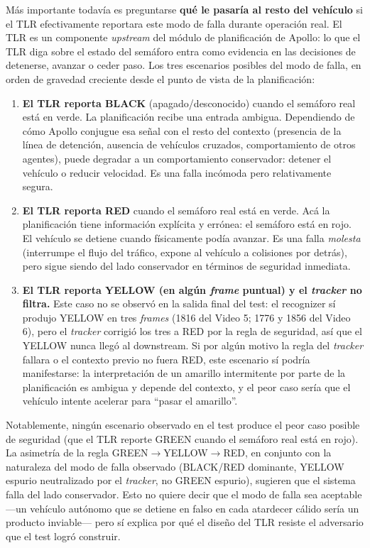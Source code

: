 Más importante todavía es preguntarse \textbf{qué le pasaría al resto del vehículo} si el TLR efectivamente reportara este modo de falla durante operación real. El TLR es un componente \textit{upstream} del módulo de planificación de Apollo: lo que el TLR diga sobre el estado del semáforo entra como evidencia en las decisiones de detenerse, avanzar o ceder paso. Los tres escenarios posibles del modo de falla, en orden de gravedad creciente desde el punto de vista de la planificación:

\begin{enumerate}
    \item \textbf{El TLR reporta BLACK} (apagado/desconocido) cuando el semáforo real está en verde. La planificación recibe una entrada ambigua. Dependiendo de cómo Apollo conjugue esa señal con el resto del contexto (presencia de la línea de detención, ausencia de vehículos cruzados, comportamiento de otros agentes), puede degradar a un comportamiento conservador: detener el vehículo o reducir velocidad. Es una falla incómoda pero relativamente segura.

    \item \textbf{El TLR reporta RED} cuando el semáforo real está en verde. Acá la planificación tiene información explícita y errónea: el semáforo está en rojo. El vehículo se detiene cuando físicamente podía avanzar. Es una falla \textit{molesta} (interrumpe el flujo del tráfico, expone al vehículo a colisiones por detrás), pero sigue siendo del lado conservador en términos de seguridad inmediata.

    \item \textbf{El TLR reporta YELLOW (en algún \textit{frame} puntual) y el \textit{tracker} no filtra.} Este caso no se observó en la salida final del test: el recognizer sí produjo YELLOW en tres \textit{frames} (1816 del Video 5; 1776 y 1856 del Video 6), pero el \textit{tracker} corrigió los tres a RED por la regla de seguridad, así que el YELLOW nunca llegó al downstream. Si por algún motivo la regla del \textit{tracker} fallara o el contexto previo no fuera RED, este escenario sí podría manifestarse: la interpretación de un amarillo intermitente por parte de la planificación es ambigua y depende del contexto, y el peor caso sería que el vehículo intente acelerar para ``pasar el amarillo''.
\end{enumerate}

Notablemente, ningún escenario observado en el test produce el peor caso posible de seguridad (que el TLR reporte GREEN cuando el semáforo real está en rojo). La asimetría de la regla GREEN$\to$YELLOW$\to$RED, en conjunto con la naturaleza del modo de falla observado (BLACK/RED dominante, YELLOW espurio neutralizado por el \textit{tracker}, no GREEN espurio), sugieren que el sistema falla del lado conservador. Esto no quiere decir que el modo de falla sea aceptable ---un vehículo autónomo que se detiene en falso en cada atardecer cálido sería un producto inviable--- pero sí explica por qué el diseño del TLR resiste el adversario que el test logró construir.


